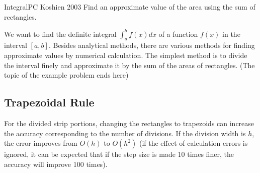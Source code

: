 \begin{versionbeta}
\begin{psbox}{Integral}{PC Koshien 2003}
Find an approximate value of the area using the sum of rectangles.

\end{psbox}

We want to find the definite integral $\displaystyle\int_a^b f(x) dx$ of a function $f(x)$ in the interval $[a,b]$. Besides analytical methods, there are various methods for finding approximate values by numerical calculation. The simplest method is to divide the interval finely and approximate it by the sum of the areas of rectangles. (The topic of the example problem ends here)

\subsection{Trapezoidal Rule}

For the divided strip portions, changing the rectangles to trapezoids can increase the accuracy corresponding to the number of divisions. If the division width is $h$, the error improves from $O(h)$ to $O(h^2)$ (if the effect of calculation errors is ignored, it can be expected that if the step size is made 10 times finer, the accuracy will improve 100 times).

\begin{center}
\end{center}


\end{versionbeta}
